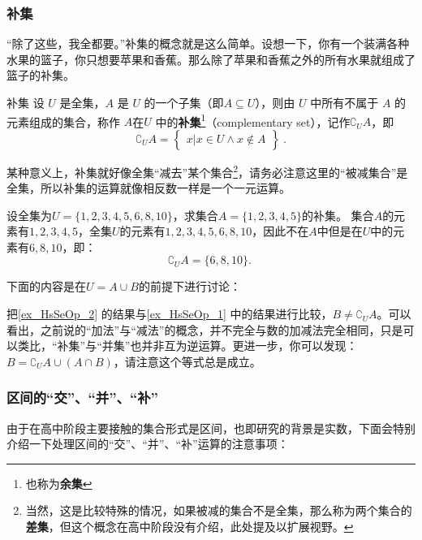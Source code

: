 \subsubsection{补集}

“除了这些，我全都要。”补集的概念就是这么简单。设想一下，你有一个装满各种水果的篮子，你只想要苹果和香蕉。那么除了苹果和香蕉之外的所有水果就组成了篮子的补集。

\begin{definition}{补集}
设 $U$ 是全集，$A$ 是 $U$ 的一个子集（即$A\subseteq U$），则由 $U$ 中所有不属于 $A$ 的元素组成的集合，称作 $A$在$U$ 中的\textbf{补集}\footnote{也称为\textbf{余集}}（complementary set），记作$\complement_UA$，即
\begin{equation}
\complement_UA = \begin{Bmatrix}x|x\in U \wedge x\notin A\end{Bmatrix}~.
\end{equation}
\end{definition}


某种意义上，补集就好像全集“减去”某个集合\footnote{当然，这是比较特殊的情况，如果被减的集合不是全集，那么称为两个集合的\textbf{差集}，但这个概念在高中阶段没有介绍，此处提及以扩展视野。}，请务必注意这里的“被减集合”是全集，所以补集的运算就像相反数一样是一个一元运算。

\begin{example}{设全集为$U=\{1,2,3,4,5,6,8,10\}$，求集合$A=\{1,2,3,4,5\}$的补集。}\label{ex_HsSeOp_2}
集合$A$的元素有$1,2,3,4,5$，全集$U$的元素有$1,2,3,4,5,6,8,10$，因此不在$A$中但是在$U$中的元素有$6,8,10$，即：
$$
\complement_UA=\{6,8,10\}.~
$$
\end{example}

下面的内容是在$U=A\cup B$的前提下进行讨论：

把\autoref{ex_HsSeOp_2} 的结果与\autoref{ex_HsSeOp_1} 中的结果进行比较，$B\neq\complement_UA$。可以看出，之前说的“加法”与“减法”的概念，并不完全与数的加减法完全相同，只是可以类比，“补集”与“并集”也并非互为逆运算。更进一步，你可以发现：$\displaystyle B=\complement_{U}A\cup(A\cap B)$，请注意这个等式总是成立。

\subsubsection{区间的“交”、“并”、“补”}

由于在高中阶段主要接触的集合形式是区间，也即研究的背景是实数，下面会特别介绍一下处理区间的“交”、“并”、“补”运算的注意事项：

